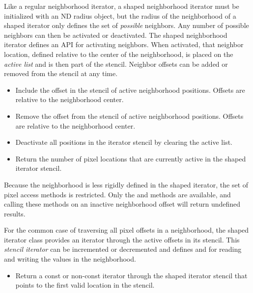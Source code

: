 {Like a regular neighborhood iterator, a shaped neighborhood iterator must be
initialized with an ND radius object, but the radius of the neighborhood of a
shaped iterator only defines the set of \emph{possible} neighbors.  Any number
of possible neighbors can then be activated or deactivated.  The shaped
neighborhood iterator defines an API for activating neighbors.  When activated,
that neighbor location, defined relative to the center of the neighborhood, is
placed on the \emph{active list} and is then part of the stencil.  Neighbor
offsets can be added or removed from the stencil at any time.

\begin{itemize}

\item \textbf{} Include the offset
 in the stencil of active neighborhood positions.  Offsets are relative
to the neighborhood center.

\item \textbf{} Remove the offset
 from the stencil of active neighborhood positions.  Offsets are
relative to the neighborhood center. 

\item \textbf{} Deactivate all positions in the
iterator stencil by clearing the active list.

\item \textbf{} Return the number
of pixel locations that are currently active in the shaped iterator stencil.

\end{itemize}

Because the neighborhood is less rigidly defined in the shaped iterator, the
set of pixel access methods is restricted.  Only the  and
 methods are available, and calling these methods on an inactive
neighborhood offset will return undefined results.

For the common case of traversing all pixel offsets in a neighborhood, the
shaped iterator class provides an iterator through the active offsets in its
stencil.   This \emph{stencil iterator} can be incremented or decremented and
defines  and  for reading and writing the values in the
neighborhood.

\begin{itemize}
\item \textbf{} Return a
const or non-const iterator through the shaped iterator stencil that points to
the first valid location in the stencil.


\end{itemize}}
